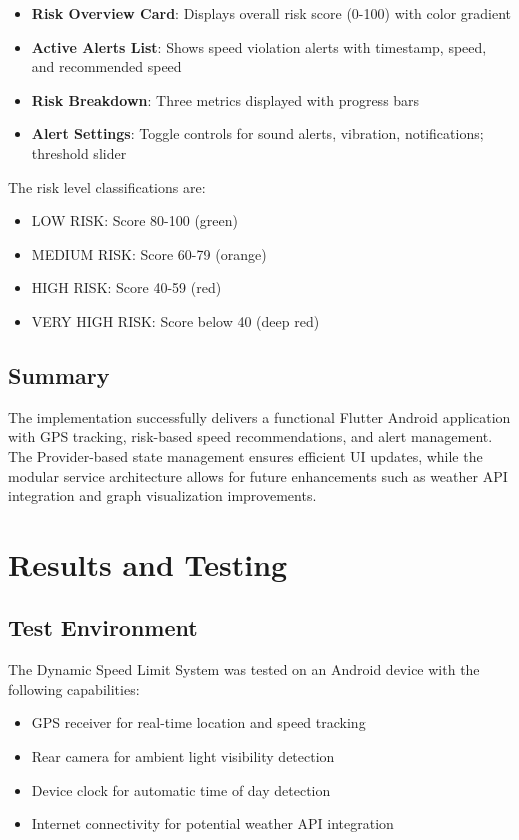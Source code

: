\begin{itemize}
    \item \textbf{Risk Overview Card}: Displays overall risk score (0-100) with color gradient
    \item \textbf{Active Alerts List}: Shows speed violation alerts with timestamp, speed, and recommended speed
    \item \textbf{Risk Breakdown}: Three metrics displayed with progress bars
    \item \textbf{Alert Settings}: Toggle controls for sound alerts, vibration, notifications; threshold slider
\end{itemize}

The risk level classifications are:
\begin{itemize}
    \item LOW RISK: Score 80-100 (green)
    \item MEDIUM RISK: Score 60-79 (orange)
    \item HIGH RISK: Score 40-59 (red)
    \item VERY HIGH RISK: Score below 40 (deep red)
\end{itemize}

\section{Summary}
The implementation successfully delivers a functional Flutter Android application with GPS tracking, risk-based speed recommendations, and alert management. The Provider-based state management ensures efficient UI updates, while the modular service architecture allows for future enhancements such as weather API integration and graph visualization improvements.

\chapter{Results and Testing}\label{chapter:Results}
\section{Test Environment}
The Dynamic Speed Limit System was tested on an Android device with the following capabilities:
\begin{itemize}
    \item GPS receiver for real-time location and speed tracking
    \item Rear camera for ambient light visibility detection
    \item Device clock for automatic time of day detection
    \item Internet connectivity for potential weather API integration
\end{itemize}

